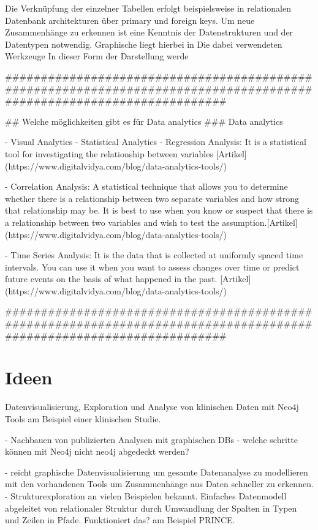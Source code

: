 Die Verknüpfung der einzelner Tabellen erfolgt beispielsweise in relationalen Datenbank architekturen über primary und foreign keys. Um neue Zusammenhänge zu erkennen ist eine Kenntnis der Datenstrukturen und der Datentypen notwendig. Graphische   liegt hierbei in  Die dabei verwendeten Werkzeuge  In dieser Form der Darstellung werde


#####################################################################################################################

## Welche möglichkeiten gibt es für Data analytics
### Data analytics

- Visual Analytics
- Statistical Analytics
	- Regression Analysis:
	It is a statistical tool for investigating the relationship between variables [Artikel](https://www.digitalvidya.com/blog/data-analytics-tools/)

	- Correlation Analysis:
	A statistical technique that allows you to determine whether there is a relationship between two separate variables and how strong that relationship may be. It is best to use when you know or suspect that there is a relationship between two variables and wish to test the assumption.[Artikel](https://www.digitalvidya.com/blog/data-analytics-tools/)

- Time Series Analysis:
	It is the data that is collected at uniformly spaced time intervals. You can use it when you want to assess changes over time or predict future events on the basis of what happened in the past. [Artikel](https://www.digitalvidya.com/blog/data-analytics-tools/)

#####################################################################################################################

\section{Ideen}
Datenvisualisierung, Exploration und Analyse von klinischen Daten mit Neo4j Tools am Beispiel einer klinischen Studie.

- Nachbauen von publizierten Analysen mit graphischen DBs
- welche schritte können mit Neo4j nicht neo4j abgedeckt werden?

- reicht graphische Datenvisualisierung um gesamte Datenanalyse zu modellieren mit den vorhandenen Tools um Zusammenhänge aus Daten schneller zu erkennen.
- Strukturexploration an vielen Beispielen bekannt. Einfaches Datenmodell abgeleitet von relationaler Struktur durch Umwandlung der Spalten in Typen und Zeilen in Pfade.
Funktioniert das? am Beispiel PRINCE. 

